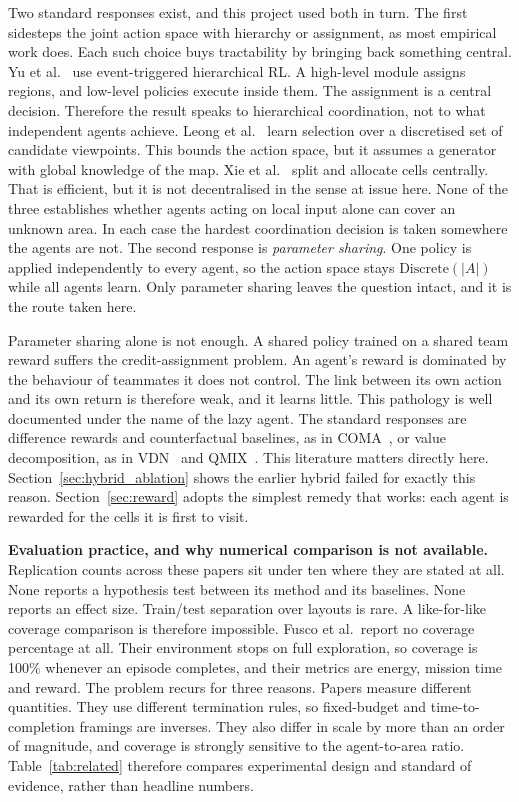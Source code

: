 \documentclass[a4paper, 10pt, conference]{ieeeconf}
\begin{document}
Two standard responses exist, and this project used both in turn. The
first sidesteps the joint action space with hierarchy or assignment,
as most empirical work does. Each such choice buys tractability by
bringing back something central. Yu et al.~\cite{yu2025} use
event-triggered hierarchical RL. A high-level module assigns regions,
and low-level policies execute inside them. The assignment is a
central decision. Therefore the result speaks to hierarchical
coordination, not to what independent agents achieve. Leong et
al.~\cite{leong2024} learn selection over a discretised set of
candidate viewpoints. This bounds the action space, but it assumes a
generator with global knowledge of the map. Xie et al.~\cite{xie2025}
split and allocate cells centrally. That is efficient, but it is not
decentralised in the sense at issue here. None of the three
establishes whether agents acting on local input alone can cover an
unknown area. In each case the hardest coordination decision is taken
somewhere the agents are not. The second response is \emph{parameter
sharing}. One policy is applied independently to every agent, so the
action space stays $\text{Discrete}(|A|)$ while all agents learn. Only
parameter sharing leaves the question intact, and it is the route
taken here.

Parameter sharing alone is not enough. A shared policy trained on a
shared team reward suffers the credit-assignment problem. An agent's
reward is dominated by the behaviour of teammates it does not control.
The link between its own action and its own return is therefore weak,
and it learns little. This pathology is well documented under the name
of the lazy agent. The standard responses are difference rewards and
counterfactual baselines, as in COMA~\cite{foerster2018}, or value
decomposition, as in VDN~\cite{sunehag2018} and
QMIX~\cite{rashid2018}. This literature matters directly here.
Section~\ref{sec:hybrid_ablation} shows the earlier hybrid failed for
exactly this reason. Section~\ref{sec:reward} adopts the simplest
remedy that works: each agent is rewarded for the cells it is first to
visit.

\textbf{Evaluation practice, and why numerical comparison is not
available.} Replication counts across these papers sit under ten where
they are stated at all. None reports a hypothesis test between its
method and its baselines. None reports an effect size. Train/test
separation over layouts is rare. A like-for-like coverage comparison
is therefore impossible. Fusco et al.\ report no coverage percentage
at all. Their environment stops on full exploration, so coverage is
100\% whenever an episode completes, and their metrics are energy,
mission time and reward. The problem recurs for three reasons. Papers
measure different quantities. They use different termination rules, so
fixed-budget and time-to-completion framings are inverses. They also
differ in scale by more than an order of magnitude, and coverage is
strongly sensitive to the agent-to-area ratio. Table~\ref{tab:related}
therefore compares experimental design and standard of evidence,
rather than headline numbers.
\end{document}
